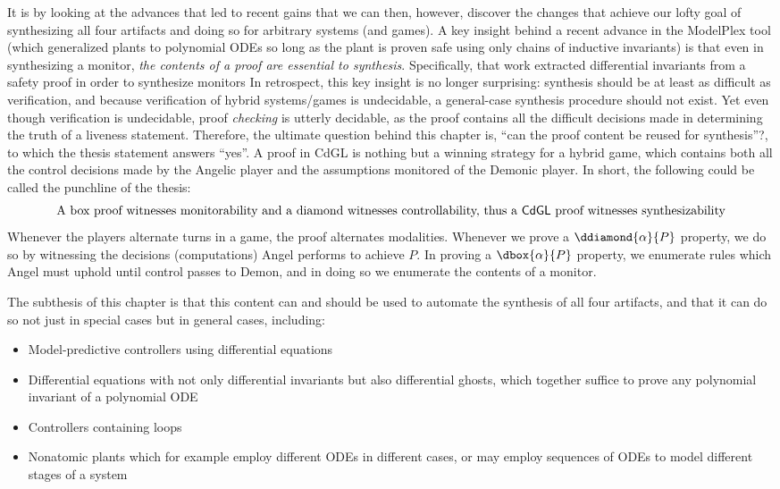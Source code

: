 \documentclass[12pt]{cmuthesis}
\theoremstyle{definition}
\theoremstyle{remark}
\newcommand{\CdGL}{\textsf{CdGL}\xspace}
\newcommand{\ModelPlex}{ModelPlex\xspace}
\begin{document}
It is by looking at the advances that led to recent gains that we can then, however, discover the changes that achieve our lofty goal of synthesizing all four artifacts and doing so for arbitrary systems (and games).
A key insight behind a recent advance in the \ModelPlex tool (which generalized plants to polynomial ODEs so long as the plant is proven safe using only chains of inductive invariants) is that even in synthesizing a monitor, \emph{the contents of a proof are essential to synthesis}.
Specifically, that work extracted differential invariants from a safety proof in order to synthesize monitors
In retrospect, this key insight is no longer surprising: synthesis should be at least as difficult as verification, and because verification of hybrid systems/games is undecidable, a general-case synthesis procedure should not exist.
Yet even though verification is undecidable, proof \emph{checking} is utterly decidable, as the proof contains all the difficult decisions made in determining the truth of a liveness statement.
Therefore, the ultimate question behind this chapter is, ``can the proof content be reused for synthesis''?, to which the thesis statement answers ``yes''.
A proof in \CdGL is nothing but a winning strategy for a hybrid game, which contains both all the control decisions made by the Angelic player and the assumptions monitored of the Demonic player.
In short, the following could be called the punchline of the thesis:
\[\text{A box proof witnesses monitorability and a diamond witnesses controllability, thus a \CdGL proof witnesses synthesizability}\]
Whenever the players alternate turns in a game, the proof alternates modalities.
Whenever we prove a $\ddiamond{\alpha}{P}$ property, we do so by witnessing the decisions (computations) Angel performs to achieve $P$.
In proving a $\dbox{\alpha}{P}$ property, we enumerate rules which Angel must uphold until control passes to Demon, and in doing so we enumerate the contents of a monitor.

The subthesis of this chapter is that this content can and should be used to automate the synthesis of all four artifacts, and that it can do so not just in special cases but in general cases, including:
\begin{itemize}
\item Model-predictive controllers using differential equations
\item Differential equations with not only differential invariants but also differential ghosts, which together suffice to prove any polynomial invariant of a polynomial ODE
\item Controllers containing loops
\item Nonatomic plants which for example employ different ODEs in different cases, or may employ sequences of ODEs to model different stages of a system
\end{itemize}
\end{document}
